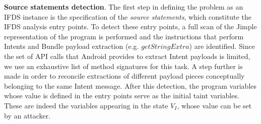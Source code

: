 

\noindent
\textbf{Source statements detection}.
The first step in defining the problem as an IFDS instance is the specification of the \textit{source statements}, which constitute the IFDS analysis entry points. To detect these entry points, a full scan of the Jimple representation of the program is performed and the instructions that perform Intents and Bundle payload extraction (e.g. $getStringExtra$) are identified. Since the set of API calls that Android provides to extract Intent payloads is limited, we use an exhaustive list of method signatures for this task.
A step further is made in order to reconcile extractions of different payload pieces conceptually belonging
 to the same Intent message. 
 After this detection, the program variables whose value is defined in the entry points serve as the initial taint variables. These are indeed the variables appearing in the state $V_I$, whose value can be set by an attacker.



